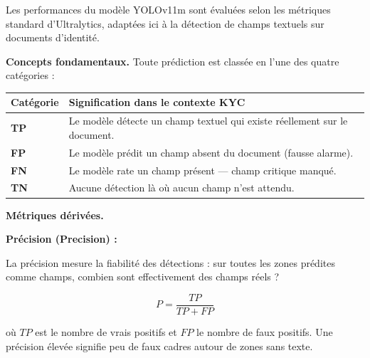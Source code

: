 \begin{tcolorbox}[
  enhanced,
  breakable,
  colback    = yolo_bg,
  colframe   = yolo_border,
  arc        = 4pt,
  boxrule    = 1.2pt,
  drop shadow,
  attach boxed title to top left = {yshift=-3mm, xshift=8mm},
  boxed title style = {
    colback   = yolo_header,
    colframe  = yolo_border,
    arc       = 3pt,
    boxrule   = 0.8pt,
    fontupper = \bfseries\color{white}\small
  },
  title = {\faSearch\quad Métriques de détection d'objets --- YOLO}
]

\noindent Les performances du modèle YOLOv11m sont évaluées selon les métriques standard d'Ultralytics, adaptées ici à la détection de champs textuels sur documents d'identité.

\medskip
\noindent\textbf{Concepts fondamentaux.} Toute prédiction est classée en l'une des quatre catégories :

\smallskip
\begin{center}
\small
\begin{tabular}{>{\bfseries}l p{9cm}}
  \rowcolor{bleu_principal!12}
  Catégorie & Signification dans le contexte KYC \\[2pt]
  \midrule
  TP & Le modèle détecte un champ textuel qui existe réellement sur le document. \\[3pt]
  FP & Le modèle prédit un champ absent du document (fausse alarme). \\[3pt]
  FN & Le modèle rate un champ présent --- champ critique manqué. \\[3pt]
  TN & Aucune détection là où aucun champ n'est attendu. \\
\end{tabular}
\end{center}

\medskip
\noindent\textbf{Métriques dérivées.}

\medskip

\noindent\textcolor{bleu_clair}{}\; \textcolor{bleu_clair}{\textbf{Précision (Precision) :}}

\noindent La précision mesure la fiabilité des détections : sur toutes les zones prédites comme champs, combien sont effectivement des champs réels ?

\begin{equation*}
  P = \frac{TP}{TP + FP}
\end{equation*}

\noindent où $TP$ est le nombre de vrais positifs et $FP$ le nombre de faux positifs. Une précision élevée signifie peu de faux cadres autour de zones sans texte.


\end{tcolorbox}
